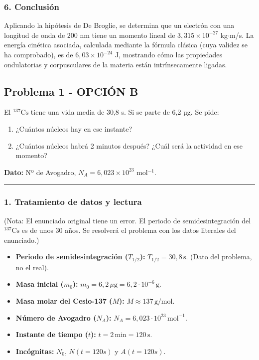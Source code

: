 \subsubsection*{6. Conclusión}
\begin{cajaconclusion}
Aplicando la hipótesis de De Broglie, se determina que un electrón con una longitud de onda de 200 nm tiene un momento lineal de $3,315 \times 10^{-27}$ kg$\cdot$m/s. La energía cinética asociada, calculada mediante la fórmula clásica (cuya validez se ha comprobado), es de $6,03 \times 10^{-24}$ J, mostrando cómo las propiedades ondulatorias y corpusculares de la materia están intrínsecamente ligadas.
\end{cajaconclusion}

\newpage

\subsection{Problema 1 - OPCIÓN B}
\label{subsec:6B_2000_sep_ext}

\begin{cajaenunciado}
El $^{137}\text{Cs}$ tiene una vida media de 30,8 s. Si se parte de 6,2 µg. Se pide:
\begin{enumerate}
    \item ¿Cuántos núcleos hay en ese instante?
    \item ¿Cuántos núcleos habrá 2 minutos después? ¿Cuál será la actividad en ese momento?
\end{enumerate}
\textbf{Dato:} Nº de Avogadro, $N_{A}=6,023\times10^{23}$ mol$^{-1}$.
\end{cajaenunciado}
\hrule

\subsubsection*{1. Tratamiento de datos y lectura}
(Nota: El enunciado original tiene un error. El periodo de semidesintegración del $^{137}\text{Cs}$ es de unos 30 años. Se resolverá el problema con los datos literales del enunciado.)
\begin{itemize}
    \item \textbf{Periodo de semidesintegración ($T_{1/2}$):} $T_{1/2} = 30,8 \, \text{s}$. (Dato del problema, no el real).
    \item \textbf{Masa inicial ($m_0$):} $m_0 = 6,2 \, \mu\text{g} = 6,2 \cdot 10^{-6} \, \text{g}$.
    \item \textbf{Masa molar del Cesio-137 ($M$):} $M \approx 137 \, \text{g/mol}$.
    \item \textbf{Número de Avogadro ($N_A$):} $N_A = 6,023 \cdot 10^{23} \, \text{mol}^{-1}$.
    \item \textbf{Instante de tiempo ($t$):} $t = 2 \, \text{min} = 120 \, \text{s}$.
    \item \textbf{Incógnitas:} $N_0$, $N(t=120s)$ y $A(t=120s)$.
\end{itemize}

